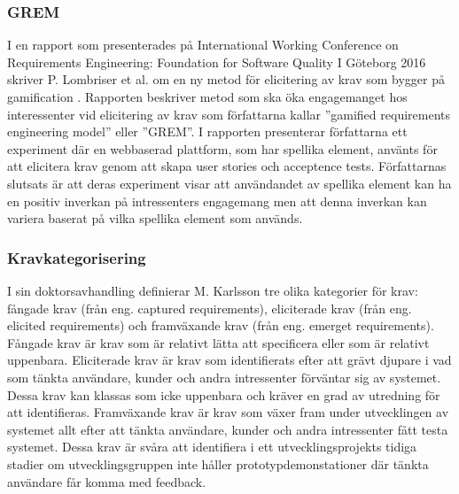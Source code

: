 \subsubsection{GREM}
I en rapport som presenterades på International Working Conference on Requirements Engineering: Foundation for Software Quality I Göteborg 2016 skriver P. Lombriser et al. om en ny metod för elicitering av krav som bygger på gamification \cite{lombriser2016gamified}. Rapporten beskriver metod som ska öka engagemanget hos interessenter vid elicitering av krav som författarna kallar ”gamified requirements engineering model” eller ”GREM”. I rapporten presenterar författarna ett experiment där en webbaserad plattform, som har spellika element, använts för att elicitera krav genom att skapa user stories och acceptence tests. Författarnas slutsats är att deras experiment visar att användandet av spellika element kan ha en positiv inverkan på intressenters engagemang men att denna inverkan kan variera baserat på vilka spellika element som används.

\subsubsection{Kravkategorisering}
I sin doktorsavhandling definierar M. Karlsson tre olika kategorier för krav: fångade krav (från eng. captured requirements), eliciterade krav (från eng. elicited requirements) och framväxande krav (från eng. emerget requirements).\cite{lkp.26083619960101} Fångade krav är krav som är relativt lätta att specificera eller som är relativt uppenbara. Eliciterade krav är krav som identifierats efter att grävt djupare i vad som tänkta användare, kunder och andra intressenter förväntar sig av systemet. Dessa krav kan klassas som icke uppenbara och kräver en grad av utredning för att identifieras. Framväxande krav är krav som växer fram under utvecklingen av systemet allt efter att tänkta användare, kunder och andra intressenter fått testa systemet. Dessa krav är svåra att identifiera i ett utvecklingsprojekts tidiga stadier om utvecklingsgruppen inte håller prototypdemonstationer där tänkta användare får komma med feedback. 
 

